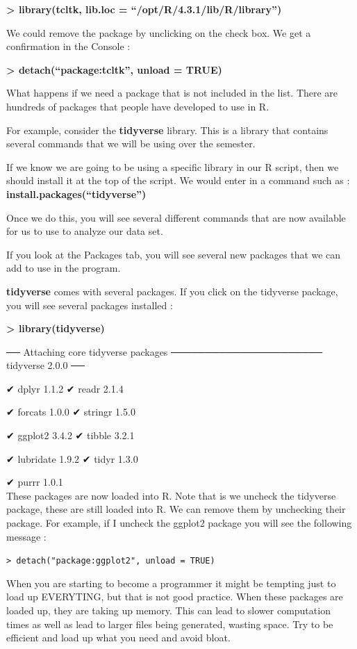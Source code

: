 \documentclass[
  letterpaper,
  DIV=11,
  numbers=noendperiod]{scrreprt}
\begin{document}
\textbf{\textgreater{} library(tcltk, lib.loc =
``/opt/R/4.3.1/lib/R/library'')}

We could remove the package by unclicking on the check box. We get a
confirmation in the Console :

\textbf{\textgreater{} detach(``package:tcltk'', unload = TRUE)}

What happens if we need a package that is not included in the list.
There are hundreds of packages that people have developed to use in R.

For example, consider the \textbf{tidyverse} library. This is a library
that contains several commands that we will be using over the semester.

If we know we are going to be using a specific library in our R script,
then we should install it at the top of the script. We would enter in a
command such as : \textbf{install.packages(``tidyverse'')}

Once we do this, you will see several different commands that are now
available for us to use to analyze our data set.

If you look at the Packages tab, you will see several new packages that
we can add to use in the program.

\textbf{tidyverse} comes with several packages. If you click on the
tidyverse package, you will see several packages installed :

\textbf{\textgreater{} library(tidyverse)}

── Attaching core tidyverse packages ────────────────────── tidyverse
2.0.0 ──

✔ dplyr 1.1.2 ✔ readr 2.1.4

✔ forcats 1.0.0 ✔ stringr 1.5.0

✔ ggplot2 3.4.2 ✔ tibble 3.2.1

✔ lubridate 1.9.2 ✔ tidyr 1.3.0

✔ purrr 1.0.1\\

These packages are now loaded into R. Note that is we uncheck the
tidyverse package, these are still loaded into R. We can remove them by
unchecking their package. For example, if I uncheck the ggplot2 package
you will see the following message :

\texttt{\textgreater{}\ detach("package:ggplot2",\ unload\ =\ TRUE)}

When you are starting to become a programmer it might be tempting just
to load up EVERYTING, but that is not good practice. When these packages
are loaded up, they are taking up memory. This can lead to slower
computation times as well as lead to larger files being generated,
wasting space. Try to be efficient and load up what you need and avoid
bloat.
\end{document}
